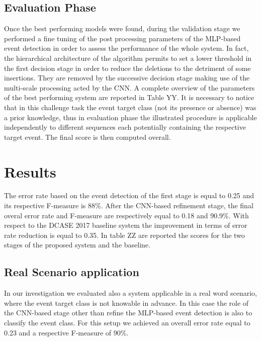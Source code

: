 \documentclass{article}
\begin{document}
\begin{sloppy}
\subsection{Evaluation Phase}
Once the best performing models were found, during the validation stage we performed a fine tuning of the post processing parameters of the MLP-based event detection in order to assess the performance of the whole system. In fact, the hierarchical architecture of the algorithm permits to set a lower threshold in the first decision stage in order to reduce the deletions to the detriment of some insertions. They are removed by the successive decision stage making use of the multi-scale processing acted by the CNN. A complete overview of the parameters of the best performing system are reported in Table YY. It is necessary to notice that in this challenge task the event target class (not its presence or absence) was a prior knowledge, thus in evaluation phase the illustrated procedure is applicable independently to different sequences each potentially containing the respective target event. The final score is then computed overall.
\section{Results}
\label{sec:results}
%
The error rate based on the event detection of the first stage is equal to 0.25 and its respective F-measure is 88\%. After the CNN-based refinement stage, the final overal error rate and F-measure are respectively equal to 0.18 and 90.9\%. With respect to the DCASE 2017 baseline system the improvement in terms of error rate reduction is equal to 0.35.  In table ZZ are reported the scores for the two stages of the proposed system and the baseline.

\subsection{Real Scenario application}
In our investigation we evaluated also a system applicable in a real word scenario, where the event target class is not knowable in advance. In this case the role of the CNN-based stage other than refine the MLP-based event detection is also to classify the event class. For this setup we achieved an overall error rate equal to 0.23 and a respective F-measure of 90\%.


\end{sloppy}
\end{document}
